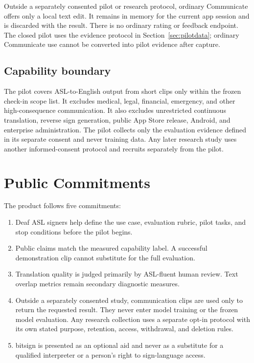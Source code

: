 \documentclass[11pt]{article}
\begin{document}
Outside a separately consented pilot or research protocol, ordinary Communicate offers
only a local text edit. It remains in memory for the current app session and is
discarded with the result. There is no ordinary rating or feedback endpoint. The
closed pilot uses the evidence protocol in Section~\ref{sec:pilotdata}; ordinary
Communicate use cannot be converted into pilot evidence after capture.

\subsection{Capability boundary}

The pilot covers ASL-to-English output from short clips only within the frozen
check-in scope list. It excludes medical, legal, financial, emergency, and other
high-consequence communication. It also excludes unrestricted continuous translation,
reverse sign generation, public App Store release, Android, and enterprise
administration. The pilot collects only the evaluation evidence defined in its
separate consent and never training data. Any later research study uses another
informed-consent protocol and recruits separately from the pilot.

\section{Public Commitments}

The product follows five commitments:

\begin{enumerate}[nosep]
  \item Deaf ASL signers help define the use case, evaluation rubric, pilot
        tasks, and stop conditions before the pilot begins.
  \item Public claims match the measured capability label. A successful demonstration
        clip cannot substitute for the full evaluation.
  \item Translation quality is judged primarily by ASL-fluent human review. Text
        overlap metrics remain secondary diagnostic measures.
  \item Outside a separately consented study, communication clips are used only to
        return the requested result. They never enter model training or the frozen
        model evaluation. Any research collection uses a separate opt-in protocol
        with its own stated purpose, retention, access, withdrawal, and deletion
        rules.
  \item bitsign is presented as an optional aid and never as a substitute for a
        qualified interpreter or a person's right to sign-language access.
\end{enumerate}
\end{document}
